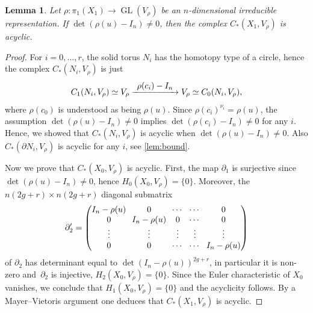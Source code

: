 \documentclass[JEP,XML,SOM,Unicode,NoFloatCountersInSection,published]{cedram}
\newcommand\To[1]{\mathchoice{\xrightarrow{\textstyle\kern4pt#1\kern3pt}}{\stackrel{#1}{\longrightarrow}}{}{}}
\theoremstyle{plain}
\newtheorem{lem}[thm]{Lemma}
\theoremstyle{definition}
\theoremstyle{remark}
\DeclareMathOperator{\GL}{GL}
\numberwithin{equation}{section}
\begin{document}
\begin{lem}
Let $\rho \colon \pi_1(X_1) \to \GL(V_{\rho})$ be an $n$-dimensional irreducible representation. If $\det (\rho(u)-I_n) \neq 0$, then
the complex $C_*(X_1, V_{\rho})$ is acyclic.
\end{lem}

\begin{proof}
For $i=0, \ldots, r$, the solid torus $N_i$ has the homotopy type of a circle, hence the complex $C_*(N_i, V_{\rho})$ is just
\[
C_1(N_i, V_{\rho}) \simeq V_{\rho} \To{\rho(c_i)-I_n} V_{\rho} \simeq C_0(N_i, V_{\rho}),
\]
where $\rho(c_0)$ is understood as being $\rho(u)$. Since $\rho(c_i)^{\nu_i} = \rho(u)$, the assumption $\det (\rho(u)-I_n) \neq 0$ implies $\det (\rho(c_i)-I_n) \neq 0$ for any $i$.
Hence, we showed that $C_*(N_i, V_{\rho})$ is acyclic when $\det (\rho(u)-I_n) \neq 0$. Also $C_*(\partial N_i, V_\rho)$ is acyclic for any $i$, see \cref{lem:bound}.

Now we prove that $C_*(X_0, V_{\rho})$ is acyclic. First, the map $\partial_1$ is surjective since $\det (\rho(u)-I_n) \neq 0$, hence $H_0(X_0, V_\rho) = \{0\}$. Moreover, the $n(2g+r) \times n(2g+r)$ diagonal submatrix
\[\arraycolsep3.5pt
\partial'_2 = \begin{pmatrix}
I_n - \rho(u) & 0 & \cdots & \cdots & 0\\
0 & I_n - \rho(u) &0 & \cdots & 0\\
\vdots & \vdots & \vdots & \vdots & \vdots\\
0 & 0 & \cdots & \cdots & I_n - \rho(u)\\
\end{pmatrix}
\]
of $\partial_2$ has determinant equal to $\det(I_n - \rho(u))^{2g+r}$, in particular it is non-zero and~$\partial_2$ is injective, \ie $H_2(X_0, V_\rho)=\{0\}$. Since the Euler characteristic of $X_0$ vanishes, we conclude that $H_1(X_0, V_\rho) = \{0\}$ and the acyclicity follows. By a Mayer--Vietoris argument one deduces that $C_*(X_1, V_\rho)$ is acyclic.
\end{proof}
\end{document}
